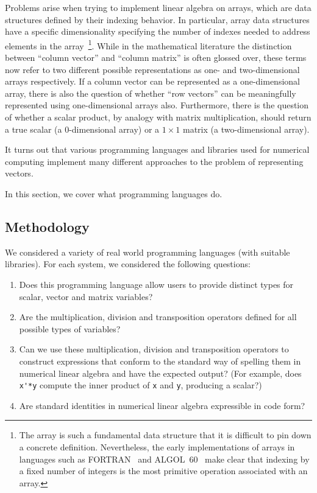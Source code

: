 Problems arise when trying to implement linear algebra on arrays, which are
data structures defined by their indexing behavior. In particular, array data
structures have a specific dimensionality specifying the number of indexes
needed to address elements in the array~\footnote{The array is such a
fundamental data structure that it is difficult to pin down a concrete
definition. Nevertheless, the early implementations of arrays in languages such
as FORTRAN~\cite[p36]{Backus1956} and ALGOL~60~\cite[Sec. 2.3]{Randell1964}
make clear that indexing by a fixed number of integers is the most primitive
operation associated with an array.}. While in the mathematical literature the
distinction between ``column vector'' and ``column matrix'' is often glossed
over, these terms now refer to two different possible representations as one-
and two-dimensional arrays respectively. If a column vector can be represented
as a one-dimensional array, there is also the question of whether ``row
vectors'' can be meaningfully represented using one-dimensional arrays also.
Furthermore, there is the question of whether a scalar product, by analogy with
matrix multiplication, should return a true scalar (a 0-dimensional array) or a
$1\times1$ matrix (a two-dimensional array).

It turns out that various programming languages and libraries used for
numerical computing implement many different approaches to the problem of
representing vectors.

In this section, we cover what programming languages do.

\subsection{Methodology}

We considered a variety of real world programming languages (with suitable
libraries).  For each system, we considered the following questions:

\begin{enumerate}

\item
Does this programming language allow users to provide distinct types for
scalar, vector and matrix variables?

\item
Are the multiplication, division and transposition operators defined for all
possible types of variables?

\item
Can we use these multiplication, division and transposition operators to
construct expressions that conform to the standard way of spelling them in
numerical linear algebra and have the expected output? (For example, does
\verb`x'*y` compute the inner product of \verb`x` and \verb`y`, producing a
scalar?)

\item
Are standard identities in numerical linear algebra expressible in code form?

\end{enumerate}

